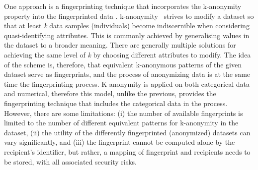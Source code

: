 One approach is a fingerprinting technique that incorporates the k-anonymity property into the fingerprinted data \cite{Kieseberg2014fingerprinting}.
k-anonymity~\cite{Sweeney2002} strives to modify a dataset so that at least \textit{k} data samples (individuals) become indiscernible when considering quasi-identifying attributes. This is commonly achieved by generalising values in the dataset to a broader meaning. There are generally multiple solutions for achieving the same level of \textit{k} by choosing different attributes to modify.
The idea of the scheme is, therefore, that equivalent k-anonymous patterns of the given dataset serve as fingerprints, and the process of anonymizing data is at the same time the fingerprinting process.
K-anonymity is applied on both categorical data and numerical, therefore this model, unlike the previous, provides the fingerprinting technique that includes the categorical data in the process.
However, there are some limitations: (i) the number of available fingerprints is limited to the number of different equivalent patterns for k-anonymity in the dataset, (ii)  the utility of the differently fingerprinted (anonymized) datasets can vary significantly, and (iii) the fingerprint cannot be computed alone by the recipient's identifier, but rather, a mapping of fingerprint and recipients needs to be stored, with all associated security risks.


